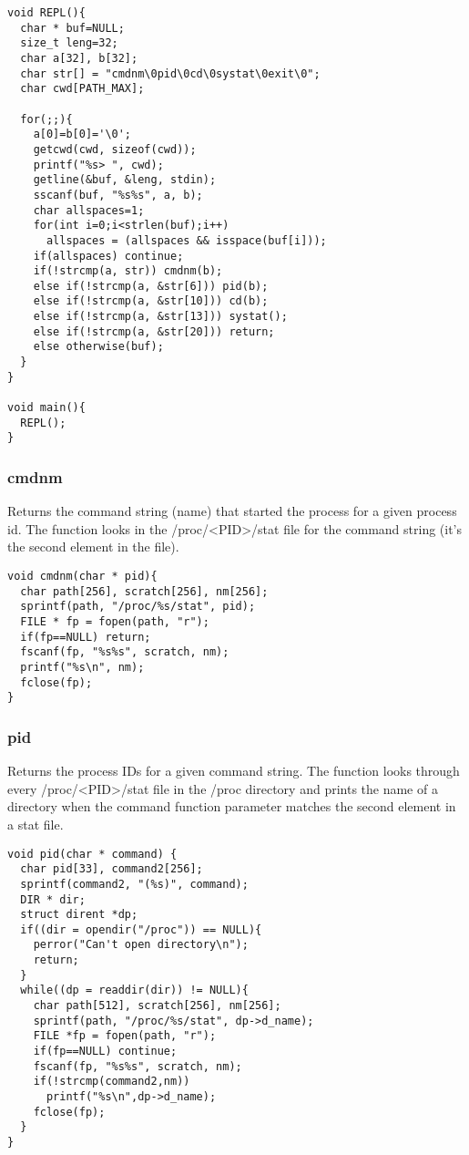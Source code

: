 \documentclass[12pt]{article}
\begin{document}
\newpage
\begin{verbatim}
void REPL(){
  char * buf=NULL;
  size_t leng=32;
  char a[32], b[32];
  char str[] = "cmdnm\0pid\0cd\0systat\0exit\0";
  char cwd[PATH_MAX];

  for(;;){
    a[0]=b[0]='\0';
    getcwd(cwd, sizeof(cwd));  
    printf("%s> ", cwd);
    getline(&buf, &leng, stdin);
    sscanf(buf, "%s%s", a, b);
    char allspaces=1;
    for(int i=0;i<strlen(buf);i++)
      allspaces = (allspaces && isspace(buf[i]));
    if(allspaces) continue;
    if(!strcmp(a, str)) cmdnm(b);	
    else if(!strcmp(a, &str[6])) pid(b);
    else if(!strcmp(a, &str[10])) cd(b);
    else if(!strcmp(a, &str[13])) systat();
    else if(!strcmp(a, &str[20])) return;
    else otherwise(buf); 
  }
}

void main(){ 
  REPL(); 
}
\end{verbatim}

\noindent \subsubsection*{cmdnm} \par
Returns the command string (name) that started the process for a given process id. The function looks in the {\ttfamily /proc/<PID>/stat } file for the command string (it's the second element in the file). 
\begin{verbatim}
void cmdnm(char * pid){
  char path[256], scratch[256], nm[256];
  sprintf(path, "/proc/%s/stat", pid);
  FILE * fp = fopen(path, "r");	
  if(fp==NULL) return;
  fscanf(fp, "%s%s", scratch, nm);
  printf("%s\n", nm);
  fclose(fp);
}
\end{verbatim}

\newpage
\noindent \subsubsection*{pid} \par
Returns the process IDs for a given command string. The function looks through every {\ttfamily /proc/<PID>/stat} file in the {\ttfamily /proc} directory and prints the name of a directory when the {\ttfamily command} function parameter matches the second element in a {\ttfamily stat} file.
\begin{verbatim}
void pid(char * command) {
  char pid[33], command2[256];
  sprintf(command2, "(%s)", command);
  DIR * dir;
  struct dirent *dp;
  if((dir = opendir("/proc")) == NULL){
    perror("Can't open directory\n");
    return;
  }
  while((dp = readdir(dir)) != NULL){
    char path[512], scratch[256], nm[256];
    sprintf(path, "/proc/%s/stat", dp->d_name);
    FILE *fp = fopen(path, "r");	
    if(fp==NULL) continue;
    fscanf(fp, "%s%s", scratch, nm);
    if(!strcmp(command2,nm))
      printf("%s\n",dp->d_name);
    fclose(fp);
  }
}
\end{verbatim}
\end{document}
